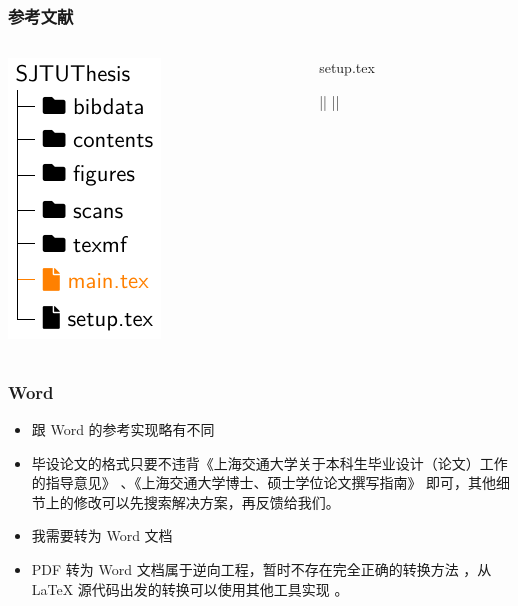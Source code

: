 \begin{frame}[fragile]
  \frametitle{参考文献}
  \begin{columns}
    \begin{column}{0.4\textwidth}
      \includegraphics[page=6]{support/figures/thesisdir.pdf}
    \end{column}
    \begin{column}{0.6\textwidth}
      \begin{codeblock}[firstnumber=111,numbersep=2pt]{setup.tex}
\usepackage[backend=biber,style=gb7714-2015]{biblatex}
\setlength{\bibitemsep}{0pt}
|\highlightline|%
|\highlightline|
      \end{codeblock}
    \end{column}
  \end{columns}
\end{frame}

\begin{frame}
  \frametitle{Word}
  \begin{itemize}
    \item[{\faQuestionCircle[regular]}] 跟 Word 的参考实现略有不同 
    \item[{\faCheckCircle[regular]}] 毕设论文的格式只要不违背《上海交通大学关于本科生毕业设计（论文）工作的指导意见》 、《上海交通大学博士、硕士学位论文撰写指南》  即可，其他细节上的修改可以先搜索解决方案，再反馈给我们。
    \item[{\faQuestionCircle[regular]}] 我需要转为 Word 文档
    \item[{\faCheckCircle[regular]}] PDF 转为 Word 文档属于逆向工程，暂时不存在完全正确的转换方法 ，从 \LaTeX{} 源代码出发的转换可以使用其他工具实现  。
  \end{itemize}
\end{frame}

